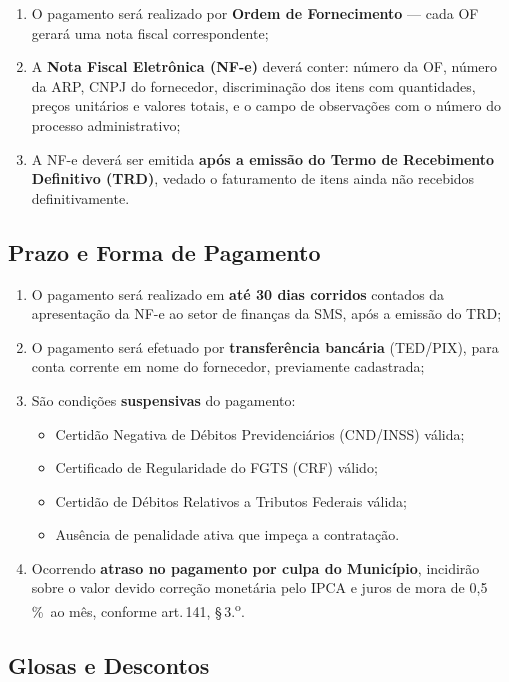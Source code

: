 \documentclass[12pt,a4paper]{article}
\newcommand{\art}[1]{art.\,#1}
\newcommand{\pct}{\%}
\begin{document}
\begin{enumerate}
  \item O pagamento será realizado por \textbf{Ordem de Fornecimento} --- cada OF
    gerará uma nota fiscal correspondente;
  \item A \textbf{Nota Fiscal Eletrônica (NF-e)} deverá conter: número da OF, número
    da ARP, CNPJ do fornecedor, discriminação dos itens com quantidades, preços
    unitários e valores totais, e o campo de observações com o número do processo
    administrativo;
  \item A NF-e deverá ser emitida \textbf{após a emissão do Termo de Recebimento
    Definitivo (TRD)}, vedado o faturamento de itens ainda não recebidos definitivamente.
\end{enumerate}

\subsection{Prazo e Forma de Pagamento}

\begin{enumerate}
  \item O pagamento será realizado em \textbf{até 30 dias corridos} contados da
    apresentação da NF-e ao setor de finanças da SMS, após a emissão do TRD;
  \item O pagamento será efetuado por \textbf{transferência bancária} (TED/PIX),
    para conta corrente em nome do fornecedor, previamente cadastrada;
  \item São condições \textbf{suspensivas} do pagamento:
    \begin{itemize}
      \item Certidão Negativa de Débitos Previdenciários (CND/INSS) válida;
      \item Certificado de Regularidade do FGTS (CRF) válido;
      \item Certidão de Débitos Relativos a Tributos Federais válida;
      \item Ausência de penalidade ativa que impeça a contratação.
    \end{itemize}
  \item Ocorrendo \textbf{atraso no pagamento por culpa do Município}, incidirão
    sobre o valor devido correção monetária pelo IPCA e juros de mora de 0,5\,\pct\ ao mês,
    conforme \art{141}, \S\,3.\textsuperscript{o}.
\end{enumerate}

\subsection{Glosas e Descontos}
\end{document}
